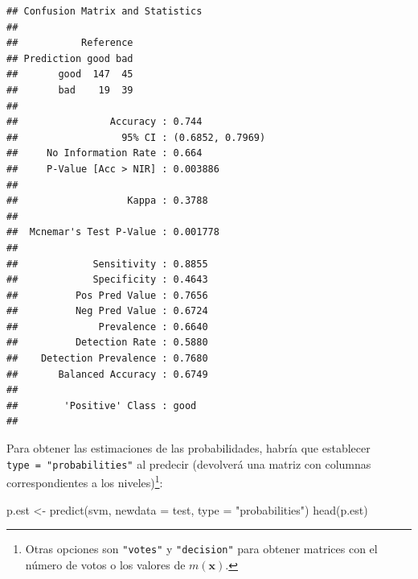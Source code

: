\documentclass[
  spanish,
]{book}
\newenvironment{Shaded}{\begin{snugshade}}{\end{snugshade}}
\newcommand{\AttributeTok}[1]{\textcolor[rgb]{0.77,0.63,0.00}{#1}}
\newcommand{\FunctionTok}[1]{\textcolor[rgb]{0.00,0.00,0.00}{#1}}
\newcommand{\NormalTok}[1]{#1}
\newcommand{\OtherTok}[1]{\textcolor[rgb]{0.56,0.35,0.01}{#1}}
\newcommand{\SpecialCharTok}[1]{\textcolor[rgb]{0.00,0.00,0.00}{#1}}
\newcommand{\StringTok}[1]{\textcolor[rgb]{0.31,0.60,0.02}{#1}}
\theoremstyle{break}
\theoremstyle{definition}
\theoremstyle{definition}
\theoremstyle{definition}
\theoremstyle{definition}
\theoremstyle{remark}
\begin{document}
\begin{Shaded}
\end{Shaded}

\begin{verbatim}
## Confusion Matrix and Statistics
## 
##           Reference
## Prediction good bad
##       good  147  45
##       bad    19  39
##                                           
##                Accuracy : 0.744           
##                  95% CI : (0.6852, 0.7969)
##     No Information Rate : 0.664           
##     P-Value [Acc > NIR] : 0.003886        
##                                           
##                   Kappa : 0.3788          
##                                           
##  Mcnemar's Test P-Value : 0.001778        
##                                           
##             Sensitivity : 0.8855          
##             Specificity : 0.4643          
##          Pos Pred Value : 0.7656          
##          Neg Pred Value : 0.6724          
##              Prevalence : 0.6640          
##          Detection Rate : 0.5880          
##    Detection Prevalence : 0.7680          
##       Balanced Accuracy : 0.6749          
##                                           
##        'Positive' Class : good            
## 
\end{verbatim}

Para obtener las estimaciones de las probabilidades, habría que establecer
\texttt{type\ =\ "probabilities"} al predecir (devolverá una matriz con columnas
correspondientes a los niveles)\footnote{Otras opciones son \texttt{"votes"} y \texttt{"decision"} para obtener matrices con el número de votos o los valores de \(m(\mathbf{x})\).}:

\begin{Shaded}
\begin{Highlighting}[]
\NormalTok{p.est }\OtherTok{\textless{}{-}} \FunctionTok{predict}\NormalTok{(svm, }\AttributeTok{newdata =}\NormalTok{ test, }\AttributeTok{type =} \StringTok{"probabilities"}\NormalTok{)}
\FunctionTok{head}\NormalTok{(p.est)}
\end{Highlighting}
\end{Shaded}
\end{document}
